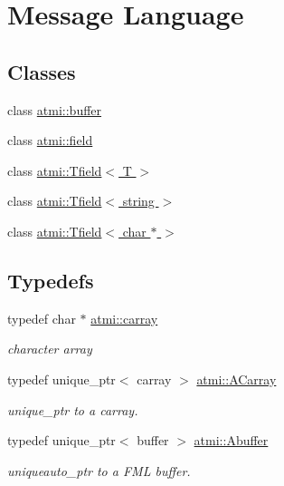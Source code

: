 \hypertarget{group___formatted}{\section{Message Language}
\label{group___formatted}
}
\subsection*{Classes}
\begin{DoxyCompactItemize}
\item 
class \hyperlink{classatmi_1_1buffer}{atmi\+::buffer}
\item 
class \hyperlink{classatmi_1_1field}{atmi\+::field}
\item 
class \hyperlink{classatmi_1_1_tfield}{atmi\+::\+Tfield$<$ T $>$}
\item 
class \hyperlink{classatmi_1_1_tfield_3_01string_01_4}{atmi\+::\+Tfield$<$ string $>$}
\item 
class \hyperlink{classatmi_1_1_tfield_3_01char_01_5_01_4}{atmi\+::\+Tfield$<$ char $\ast$ $>$}
\end{DoxyCompactItemize}
\subsection*{Typedefs}
\begin{DoxyCompactItemize}
\item 
\hypertarget{group___formatted_ga8b57f9a4e2453d8e5d82ac0016e35e87}{typedef char $\ast$ \hyperlink{group___formatted_ga8b57f9a4e2453d8e5d82ac0016e35e87}{atmi\+::carray}}\label{group___formatted_ga8b57f9a4e2453d8e5d82ac0016e35e87}

\begin{DoxyCompactList}\small\item\em character array \end{DoxyCompactList}\item 
\hypertarget{group___formatted_ga374230d2a2355a879f42c829eb2d70ff}{typedef unique\+\_\+ptr$<$ carray $>$ \hyperlink{group___formatted_ga374230d2a2355a879f42c829eb2d70ff}{atmi\+::\+A\+Carray}}\label{group___formatted_ga374230d2a2355a879f42c829eb2d70ff}

\begin{DoxyCompactList}\small\item\em unique\+\_\+ptr to a carray. \end{DoxyCompactList}\item 
\hypertarget{group___formatted_ga268bae34ffaa2c2e72fabbcb54841934}{typedef unique\+\_\+ptr$<$ buffer $>$ \hyperlink{group___formatted_ga268bae34ffaa2c2e72fabbcb54841934}{atmi\+::\+Abuffer}}\label{group___formatted_ga268bae34ffaa2c2e72fabbcb54841934}

\begin{DoxyCompactList}\small\item\em uniqueauto\+\_\+ptr to a F\+M\+L buffer. \end{DoxyCompactList}\end{DoxyCompactItemize}
